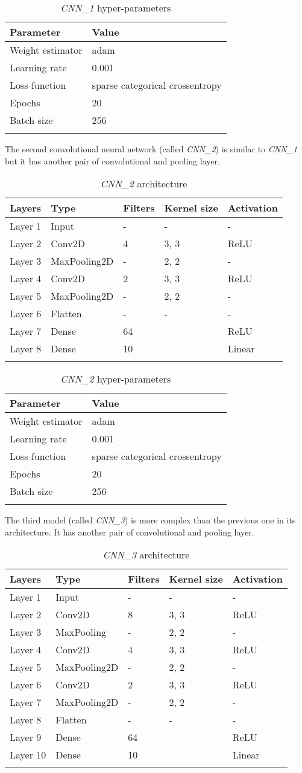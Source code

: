 \begin{longtable}[]{@{}ll@{}}
	\toprule
	\textbf{Parameter} & \textbf{Value}\tabularnewline
	\midrule
	\endhead
	Weight estimator & adam\tabularnewline
	Learning rate & 0.001\tabularnewline
	Loss function & sparse categorical crossentropy\tabularnewline
	Epochs & 20\tabularnewline
	Batch size & 256\tabularnewline
	\bottomrule
	\caption{\emph{CNN\_1} hyper-parameters}
\end{longtable}

The second convolutional neural network (called \emph{CNN\_2}) is
similar to \emph{CNN\_1} but it has another pair of convolutional and
pooling layer.

\begin{longtable}[]{@{}lllll@{}}
	\toprule
	\textbf{Layers} & Type & \textbf{Filters} & \textbf{Kernel size} &
	\textbf{Activation}\tabularnewline
	\midrule
	\endhead
	Layer 1 & Input & - & - & -\tabularnewline
	Layer 2 & Conv2D & 4 & 3, 3 & ReLU\tabularnewline
	Layer 3 & MaxPooling2D & - & 2, 2 & -\tabularnewline
	Layer 4 & Conv2D & 2 & 3, 3 & ReLU\tabularnewline
	Layer 5 & MaxPooling2D & - & 2, 2 & -\tabularnewline
	Layer 6 & Flatten & - & - & -\tabularnewline
	Layer 7 & Dense & 64 & & ReLU\tabularnewline
	Layer 8 & Dense & 10 & & Linear\tabularnewline
	\bottomrule
		\caption{\emph{CNN\_2} architecture}
\end{longtable}

\newpage

\begin{longtable}[]{@{}ll@{}}
	\toprule
	\textbf{Parameter} & \textbf{Value}\tabularnewline
	\midrule
	\endhead
	Weight estimator & adam\tabularnewline
	Learning rate & 0.001\tabularnewline
	Loss function & sparse categorical crossentropy\tabularnewline
	Epochs & 20\tabularnewline
	Batch size & 256\tabularnewline
	\bottomrule
		\caption{\emph{CNN\_2} hyper-parameters}
\end{longtable}

The third model (called \emph{CNN\_3}) is more complex than the previous
one in its architecture. It has another pair of convolutional and
pooling layer.

\begin{longtable}[]{@{}lllll@{}}
	\toprule
	\textbf{Layers} & \textbf{Type} & \textbf{Filters} & \textbf{Kernel size} &
	\textbf{Activation}\tabularnewline
	\midrule
	\endhead
	Layer 1 & Input & - & - & -\tabularnewline
	Layer 2 & Conv2D & 8 & 3, 3 & ReLU\tabularnewline
	Layer 3 & MaxPooling & - & 2, 2 & -\tabularnewline
	Layer 4 & Conv2D & 4 & 3, 3 & ReLU\tabularnewline
	Layer 5 & MaxPooling2D & - & 2, 2 & -\tabularnewline
	Layer 6 & Conv2D & 2 & 3, 3 & ReLU\tabularnewline
	Layer 7 & MaxPooling2D & - & 2, 2 & -\tabularnewline
	Layer 8 & Flatten & - & - & -\tabularnewline
	Layer 9 & Dense & 64 & & ReLU\tabularnewline
	Layer 10 & Dense & 10 & & Linear\tabularnewline
	\bottomrule
		\caption{\emph{CNN\_3} architecture}
\end{longtable}

